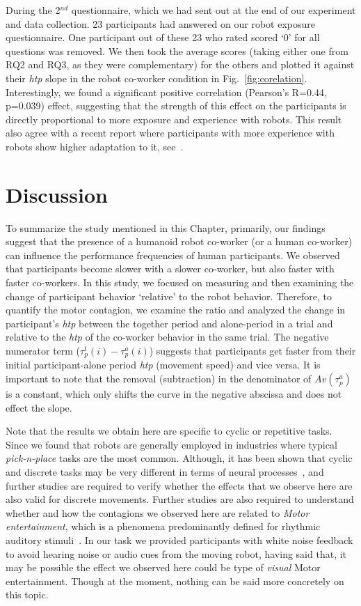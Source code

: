 During the 2$^{nd}$ questionnaire, which we had sent out at the end of our experiment and data collection. 23 participants had answered on our robot exposure questionnaire. One participant out of these 23 who rated scored `0' for all questions was removed. We then took the average scores (taking either one from RQ2 and RQ3, as they were complementary) for the others and plotted it against their {\it htp} slope in the robot co-worker condition in Fig.~\ref{fig:corelation}. Interestingly, we found a significant positive correlation (Pearson's R=0.44, p=0.039) effect, suggesting that the strength of this effect on the participants is directly proportional to more exposure and experience with robots. This result also agree with a recent report where participants with more experience with robots show higher adaptation to it, see~\cite{vannucci:roman:2017}.


\section{Discussion}

To summarize the study mentioned in this Chapter, primarily, our findings suggest that the presence of a humanoid robot co-worker (or a human co-worker) can influence the performance frequencies of human participants. We observed that participants become slower with a slower co-worker, but also faster with faster co-workers. In this study, we focused on measuring and then examining the change of participant behavior `relative' to the robot behavior. Therefore, to quantify the motor contagion, we examine the ratio and analyzed the change in participant's \textit{htp} between the together period and alone-period in a trial and relative to the {\it htp} of the co-worker behavior in the same trial. The negative numerator term ($\tau_p^t(i)-\tau_p^a(i)$) suggests that participants get faster from their initial participant-alone period \textit{htp} (movement speed) and vice versa. It is important to note that the removal (subtraction) in the denominator of $Av(\tau_p^a)$ is a constant, which only shifts the curve in the negative abscissa and does not effect the slope.  


Note that the results we obtain here are specific to cyclic or repetitive tasks. Since we found that robots are generally employed in industries where typical \textit{pick-n-place} tasks are the most common. Although, it has been shown that cyclic and discrete tasks may be very different in terms of neural processes~\cite{Schaal:Nature:2004}, and further studies are required to verify whether the effects that we observe here are also valid for discrete movements. Further studies are also required to understand whether and how the contagions we observed here are related to \textit{Motor entertainment}, which is a phenomena predominantly defined for rhythmic auditory stimuli~\cite{Tierney:Frontiers:2014,Schachner:Elsevier:2009}. In our task we provided participants with white noise feedback to avoid hearing noise or audio cues from the moving robot, having said that, it may be possible the effect we observed here could be type of \textit{visual} Motor entertainment. Though at the moment, nothing can be said more concretely on this topic.


